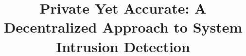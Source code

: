 \documentclass[conference,compsoc]{sty/IEEEtran}
\begin{document}
\title{Private Yet Accurate: A Decentralized Approach to System Intrusion Detection}

\maketitle


% 
% 


% 


% 



% 


% 
% 

% 
% 
% 

\balance

{\footnotesize\setlength{\bibsep}{3pt}
}

\end{document}
